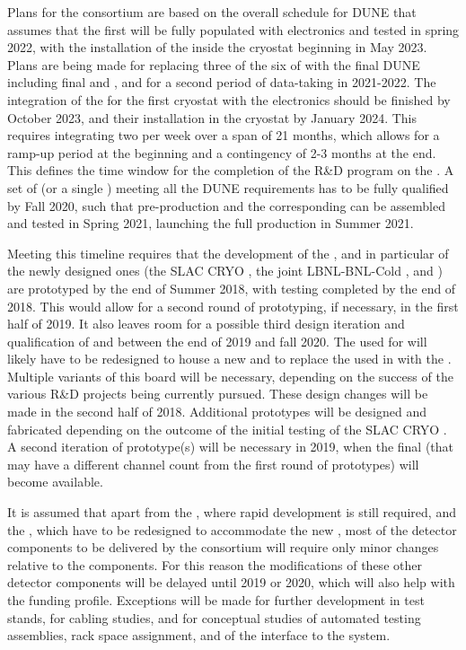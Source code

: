 Plans for the  consortium are based on the overall schedule for DUNE
that assumes that the first  will be fully populated with electronics
and tested in spring 2022, with the installation of
the  inside the cryostat beginning in May 2023. Plans are being made
for replacing three of the six  of  with the final DUNE 
 including final  and , and for a second period of
data-taking in 2021-2022. The integration of the
 for the first cryostat with the electronics should be finished by
October 2023, and their installation in the cryostat by January 2024.
This requires integrating two  per week over a span of 21 months,
which allows for a ramp-up period at the beginning and a contingency of
2-3 months at the end. This defines the time window for the completion of
the R\&D program on the . A set of  (or a single ) meeting
all the DUNE requirements has to be fully qualified by Fall 2020, such
that pre-production  and the corresponding  can be assembled and
tested in Spring 2021, launching the full production in Summer 2021.

Meeting this timeline requires that the development of the , and in particular
of the newly designed ones (the SLAC CRYO , the joint LBNL-BNL-\fnal Cold ,
and ) are prototyped by the end of Summer 2018, with testing
completed by the end of 2018. This would allow for a second round of prototyping,
if necessary, in the first half of 2019. It also leaves room for a possible
third design iteration and qualification of  and  between the
end of 2019 and fall 2020. The  used for  will
likely have to be redesigned to house a new  and to replace the  used
in  with the  . Multiple variants of this board will be
necessary, depending on the success of the various  R\&D projects being currently
pursued. These design changes will be made in the second half of 2018.
Additional  prototypes will be designed and fabricated depending on
the outcome of the initial testing of the SLAC CRYO . A second iteration
of  prototype(s) will be necessary in 2019, when the final  (that
may have a different channel count from the first round of prototypes) will become
available. 

It is assumed that apart from the , where rapid development is still
required, and the , which have to be redesigned to accommodate the
new , most of the detector components to be delivered by the  consortium
will require only minor changes relative to the  components. For
this reason the modifications of these other detector components will
be delayed until 2019 or 2020, which will also help with the funding profile.
Exceptions will be made for further development in test stands, for cabling
studies, and for conceptual studies of automated testing assemblies, rack space
assignment, and of the interface to the  system.
